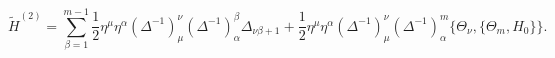 \begin{equation}
 \tilde{H}^{(2)}=\sum_{\beta=1}^{m-1} \frac{1}{2} \eta^\mu \eta^\alpha (\Delta^{-1})_\mu
 ^\nu (\Delta^{-1})_\alpha ^\beta
 \Delta_{\nu \beta+1} + \frac{1}{2}\eta^\mu \eta^\alpha (\Delta^{-1})_\mu ^\nu(\Delta^{-1})_\alpha ^m \{\Theta_\nu , \{\Theta_m , H_0\}\}.
 \label{g4}
 \end{equation}

